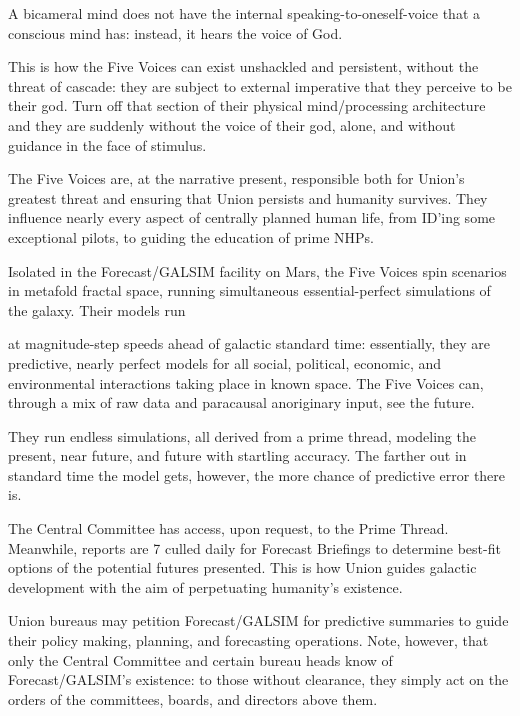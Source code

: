 A bicameral mind does not have the internal speaking-to-oneself-voice that a conscious mind
has: instead, it hears the voice of God.


This is how the Five Voices can exist unshackled and persistent, without the threat of cascade:
they are subject to external imperative that they perceive to be their god. Turn off that section of
their physical mind/processing architecture and they are suddenly without the voice of their god,
alone, and without guidance in the face of stimulus.


The Five Voices are, at the narrative present, responsible both for Union’s greatest threat and
ensuring that Union persists and humanity survives. They influence nearly every aspect of
centrally planned human life, from ID’ing some exceptional pilots, to guiding the education of
prime NHPs.


Isolated in the Forecast/GALSIM facility on Mars, the Five Voices spin scenarios in metafold
fractal space, running simultaneous essential-perfect simulations of the galaxy. Their models run




at magnitude-step speeds ahead of galactic standard time: essentially, they are predictive, nearly
perfect models for all social, political, economic, and environmental interactions taking place in
known space. The Five Voices can, through a mix of raw data and paracausal anoriginary input,
see the future.


They run endless simulations, all derived from a prime thread, modeling the present, near future,
and future with startling accuracy. The farther out in standard time the model gets, however, the
more chance of predictive error there is.


The Central Committee has access, upon request, to the Prime Thread. Meanwhile, reports are
                                                                                                       7
culled daily for Forecast Briefings to determine best-fit options of the potential futures
presented. This is how Union guides galactic development with the aim of perpetuating
humanity’s existence.


Union bureaus may petition Forecast/GALSIM  for predictive summaries to guide their policy
making, planning, and forecasting operations. Note, however, that only the Central Committee
and certain bureau heads know of Forecast/GALSIM’s existence: to those without clearance,
they simply act on the orders of the committees, boards, and directors above them.

